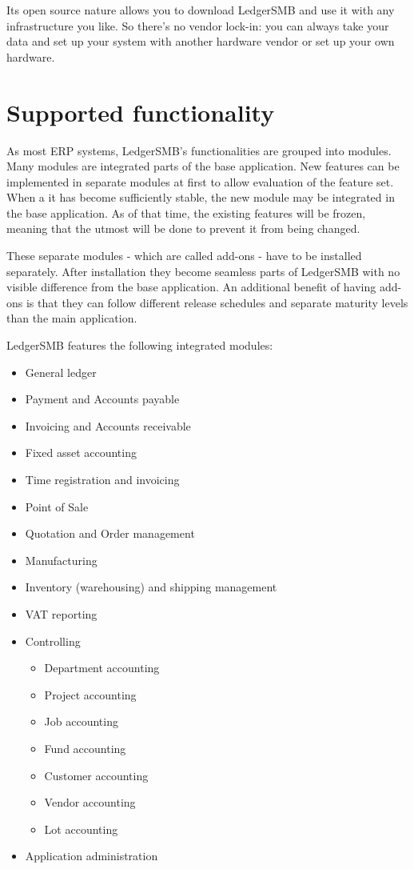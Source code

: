 Its open source nature allows you to download LedgerSMB and use it with any
infrastructure you like. So there's no vendor lock-in: you can
always take your data and set up your system with another hardware vendor
or set up your own hardware.

\section{Supported functionality}
\label{sec-ledgersmb-modules}
As most \gls{ERP} systems, LedgerSMB's functionalities are grouped into modules.
Many modules are integrated parts of the base application.  New features
can be implemented in separate modules at first to allow evaluation of the
feature set.  When a it has become sufficiently stable, the new module may
be integrated in the base application. As of that time, the existing features
will be frozen, meaning that the utmost will be done to prevent it from being
changed.

These separate modules - which are called \glspl{add-on} - have to be
installed separately.  After installation they become seamless parts of
LedgerSMB with no visible difference from the base application. An
additional benefit of having \glspl{add-on} is that they can follow different
release schedules and separate maturity levels than the main application.


LedgerSMB \ledgerSMBversion features the following integrated modules:

\begin{itemize}
	\item General ledger
	\item Payment and Accounts payable
	\item Invoicing and Accounts receivable
	\item Fixed asset accounting
	\item Time registration and invoicing
	\item Point of Sale
	\item Quotation and Order management
	\item Manufacturing
	\item Inventory (warehousing) and shipping management
	\item VAT reporting
	\item Controlling
	\begin{itemize}
		\item Department accounting
		\item Project accounting
		\item Job accounting
		\item Fund accounting
		\item Customer accounting
		\item Vendor accounting
		\item Lot accounting
	\end{itemize}
	\item Application administration
\end{itemize}

